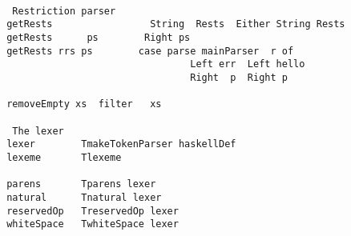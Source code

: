 \documentclass{article}
\begin{document}
\begin{tabbing}
\tt ~\\
\tt ~~Restriction~parser\\
\tt ~getRests~~~~~~~~~~~~~~~~~String~~Rests~~Either~String~Rests\\
\tt ~getRests~~~~~~ps~~~~~~~~Right~ps\\
\tt ~getRests~rrs~ps~~~~~~~~case~parse~mainParser~~r~of\\
\tt ~~~~~~~~~~~~~~~~~~~~~~~~~~~~~~~~~Left~err~~Left~hello\\
\tt ~~~~~~~~~~~~~~~~~~~~~~~~~~~~~~~~~Right~~p~~Right~p\\
\tt ~\\
\tt ~removeEmpty~xs~~filter~~~xs\\
\tt ~\\
\tt ~~The~lexer\\
\tt ~lexer~~~~~~~~TmakeTokenParser~haskellDef\\
\tt ~lexeme~~~~~~~Tlexeme\\
\tt ~\\
\tt ~parens~~~~~~~Tparens~lexer\\
\tt ~natural~~~~~~Tnatural~lexer\\
\tt ~reservedOp~~~TreservedOp~lexer\\
\tt ~whiteSpace~~~TwhiteSpace~lexer
\end{tabbing}
\end{document}
